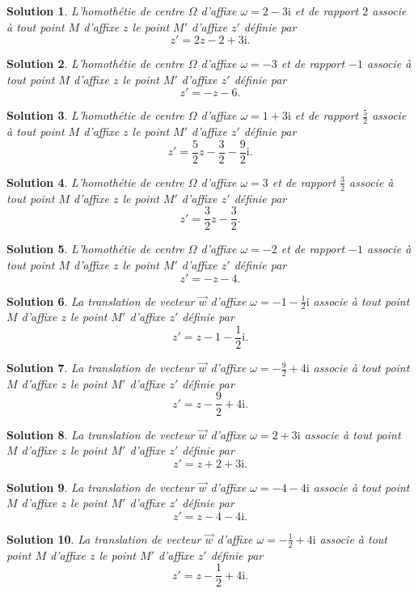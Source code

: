\documentclass[a4paper]{article}
\newtheorem{solution}{Solution}
\begin{document}
\begin{solution}
L'homoth\'etie de centre $\Omega$ d'affixe $\omega=2-3\mathrm{i}$ et de rapport $2$ associe \`a tout point $M$ d'affixe $z$ le point $M'$ d'affixe $z'$ d\'efinie par $$z'=2z-2+3\mathrm{i}.$$
\end{solution}\begin{solution}
L'homoth\'etie de centre $\Omega$ d'affixe $\omega=-3$ et de rapport $-1$ associe \`a tout point $M$ d'affixe $z$ le point $M'$ d'affixe $z'$ d\'efinie par $$z'=-z-6.$$
\end{solution}\begin{solution}
L'homoth\'etie de centre $\Omega$ d'affixe $\omega=1+3\mathrm{i}$ et de rapport $\frac{5}{2}$ associe \`a tout point $M$ d'affixe $z$ le point $M'$ d'affixe $z'$ d\'efinie par $$z'=\frac{5}{2}z-\frac{3}{2}-\frac{9}{2}\mathrm{i}.$$
\end{solution}\begin{solution}
L'homoth\'etie de centre $\Omega$ d'affixe $\omega=3$ et de rapport $\frac{3}{2}$ associe \`a tout point $M$ d'affixe $z$ le point $M'$ d'affixe $z'$ d\'efinie par $$z'=\frac{3}{2}z-\frac{3}{2}.$$
\end{solution}\begin{solution}
L'homoth\'etie de centre $\Omega$ d'affixe $\omega=-2$ et de rapport $-1$ associe \`a tout point $M$ d'affixe $z$ le point $M'$ d'affixe $z'$ d\'efinie par $$z'=-z-4.$$
\end{solution}
\begin{solution}
La translation de vecteur $\vec{w}$ d'affixe $\omega=-1-\frac{1}{2}\mathrm{i}$ associe \`a tout point $M$ d'affixe $z$ le point $M'$ d'affixe $z'$ d\'efinie par $$\displaystyle z'=z-1-\frac{1}{2}\mathrm{i}.$$
\end{solution}\begin{solution}
La translation de vecteur $\vec{w}$ d'affixe $\omega=-\frac{9}{2}+4\mathrm{i}$ associe \`a tout point $M$ d'affixe $z$ le point $M'$ d'affixe $z'$ d\'efinie par $$\displaystyle z'=z-\frac{9}{2}+4\mathrm{i}.$$
\end{solution}\begin{solution}
La translation de vecteur $\vec{w}$ d'affixe $\omega=2+3\mathrm{i}$ associe \`a tout point $M$ d'affixe $z$ le point $M'$ d'affixe $z'$ d\'efinie par $$\displaystyle z'=z+2+3\mathrm{i}.$$
\end{solution}\begin{solution}
La translation de vecteur $\vec{w}$ d'affixe $\omega=-4-4\mathrm{i}$ associe \`a tout point $M$ d'affixe $z$ le point $M'$ d'affixe $z'$ d\'efinie par $$\displaystyle z'=z-4-4\mathrm{i}.$$
\end{solution}\begin{solution}
La translation de vecteur $\vec{w}$ d'affixe $\omega=-\frac{1}{2}+4\mathrm{i}$ associe \`a tout point $M$ d'affixe $z$ le point $M'$ d'affixe $z'$ d\'efinie par $$\displaystyle z'=z-\frac{1}{2}+4\mathrm{i}.$$
\end{solution}
\end{document}
